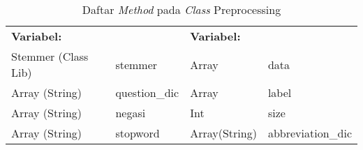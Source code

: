 \begin{table}[H]
	\caption{Daftar \textit{Method} pada \textit{Class} Preprocessing}
	\centering
	\small
	\begin{adjustbox}{width=1\textwidth}	
	\begin{tabular}{|p{4cm} p{2.1cm} p{3cm} p{3.1cm}|}
		\hline
		\multicolumn{2}{|l}{\textbf{Variabel:}}&\multicolumn{2}{l|}{\textbf{Variabel:}}\\
		Stemmer (Class Lib)&stemmer&Array&data\\
		Array (String)&question\_dic&Array&label\\
		Array (String)&negasi&Int&size\\
		Array (String)&stopword&Array(String)&abbreviation\_dic\\
		\hline
	\end{tabular}
	\end{adjustbox}
\end{table}

